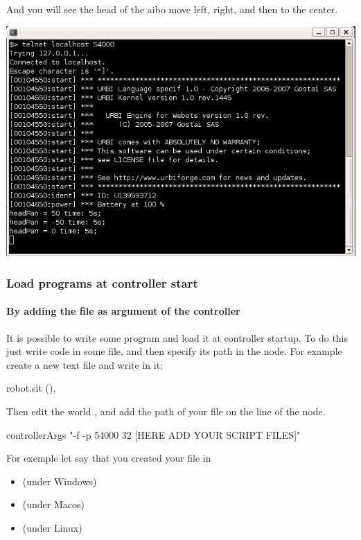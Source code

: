 And you will see the head of the aibo move left, right, and then to
the center.

\begin{center}
  \includegraphics[width=.8\linewidth]{img/webots/telnet-some-urbi-cmd}
\end{center}

\subsubsection{Load \urbi programs at controller start}

\paragraph{By adding the file as argument of the \urbi controller}

It is possible to write some \us program and load it at controller
startup.  To do this just write \us code in some file, and then
specify its path in the  \webots node.  For
example create a new text file  and write in it:

\begin{urbiunchecked}
robot.sit (),
\end{urbiunchecked}

Then edit the \webots world , and
add the path of your file  on the line of the
 node.


\begin{shell}
controllerArgs "-f -p 54000 32 [HERE ADD YOUR SCRIPT FILES]"
\end{shell}

For exemple let say that you created your file in
\begin{itemize}
\item {}
  (under Windows)
\item {}
  (under Macos)
\item {}
  (under Linux)
\end{itemize}


